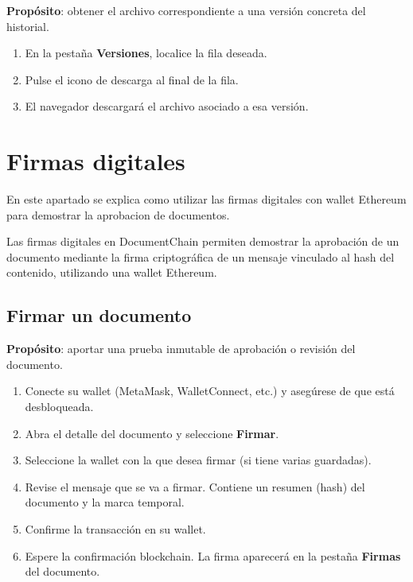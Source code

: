 \documentclass[11pt, a4paper]{article}
\begin{document}
\textbf{Prop\'{o}sito}: obtener el archivo correspondiente a una versi\'{o}n concreta del historial.

\begin{enumerate}
    \item En la pesta\~{n}a \textbf{Versiones}, localice la fila deseada.
    \item Pulse el icono de descarga al final de la fila.
    \item El navegador descargar\'{a} el archivo asociado a esa versi\'{o}n.
\end{enumerate}

\section{Firmas digitales}

En este apartado se explica como utilizar las firmas digitales con wallet Ethereum para demostrar la aprobacion de documentos.

Las firmas digitales en DocumentChain permiten demostrar la aprobaci\'{o}n de un documento mediante la firma criptogr\'{a}fica de un mensaje vinculado al hash del contenido, utilizando una wallet Ethereum.

\subsection{Firmar un documento}

\textbf{Prop\'{o}sito}: aportar una prueba inmutable de aprobaci\'{o}n o revisi\'{o}n del documento.

\begin{enumerate}
    \item Conecte su wallet (MetaMask, WalletConnect, etc.) y aseg\'{u}rese de que est\'{a} desbloqueada.
    \item Abra el detalle del documento y seleccione \textbf{Firmar}.
    \item Seleccione la wallet con la que desea firmar (si tiene varias guardadas).
    \item Revise el mensaje que se va a firmar. Contiene un resumen (hash) del documento y la marca temporal.
    \item Confirme la transacci\'{o}n en su wallet.
    \item Espere la confirmaci\'{o}n blockchain. La firma aparecer\'{a} en la pesta\~{n}a \textbf{Firmas} del documento.
\end{enumerate}
\end{document}
